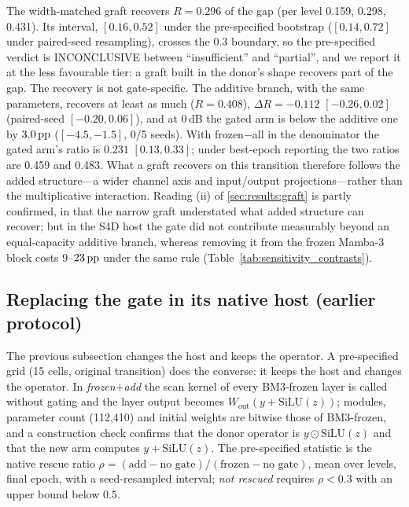 The width-matched graft recovers $R = 0.296$ of the gap (per level 0.159, 0.298, 0.431). Its interval, $[0.16, 0.52]$ under the pre-specified bootstrap ($[0.14, 0.72]$ under paired-seed resampling), crosses the 0.3 boundary, so the pre-specified verdict is INCONCLUSIVE between ``insufficient'' and ``partial'', and we report it at the less favourable tier: a graft built in the donor's shape recovers part of the gap. The recovery is not gate-specific. The additive branch, with the same parameters, recovers at least as much ($R = 0.408$), $\Delta R = -0.112$ $[-0.26, 0.02]$ (paired-seed $[-0.20, 0.06]$), and at 0\,dB the gated arm is below the additive one by $3.0\,\mathrm{pp}$ ($[-4.5, -1.5]$, 0/5 seeds). With frozen$-$all in the denominator the gated arm's ratio is $0.231$ $[0.13, 0.33]$; under best-epoch reporting the two ratios are 0.459 and 0.483. What a graft recovers on this transition therefore follows the added structure---a wider channel axis and input/output projections---rather than the multiplicative interaction. Reading (ii) of \ref{sec:results:graft} is partly confirmed, in that the narrow graft understated what added structure can recover; but in the S4D host the gate did not contribute measurably beyond an equal-capacity additive branch, whereas removing it from the frozen Mamba-3 block costs $9$--$23\,\mathrm{pp}$ under the same rule (Table~\ref{tab:sensitivity_contrasts}).

\subsection{Replacing the gate in its native host (earlier protocol)}
\label{sec:results:nativeadd}

The previous subsection changes the host and keeps the operator. A pre-specified grid (15 cells, original transition) does the converse: it keeps the host and changes the operator. In \emph{frozen$+$add} the scan kernel of every BM3-frozen layer is called without gating and the layer output becomes $W_{\mathrm{out}}(y + \mathrm{SiLU}(z))$; modules, parameter count (112{,}410) and initial weights are bitwise those of BM3-frozen, and a construction check confirms that the donor operator is $y \odot \mathrm{SiLU}(z)$ and that the new arm computes $y + \mathrm{SiLU}(z)$. The pre-specified statistic is the native rescue ratio $\rho = (\text{add} - \text{no gate})/(\text{frozen} - \text{no gate})$, mean over levels, final epoch, with a seed-resampled interval; \emph{not rescued} requires $\rho < 0.3$ with an upper bound below $0.5$.

